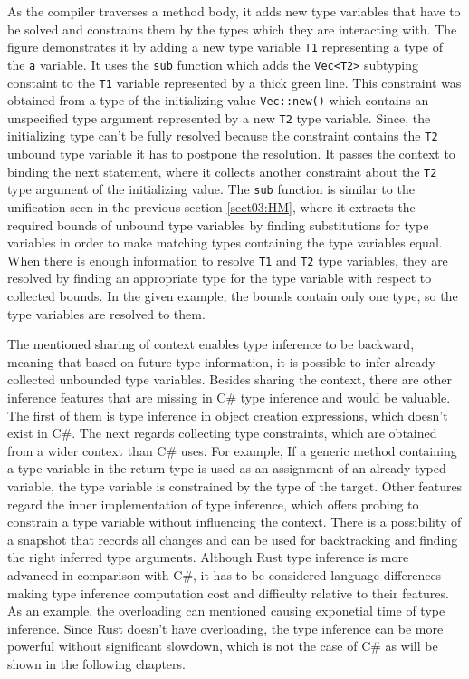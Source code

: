 As the compiler traverses a method body, it adds new type variables that have to be solved and constrains them by the types which they are interacting with. 
The figure demonstrates it by adding a new type variable \texttt{T1} representing a type of the \texttt{a} variable.
It uses the \texttt{sub} function which adds the \texttt{Vec<T2>} subtyping constaint to the \texttt{T1} variable represented by a thick green line.
This constraint was obtained from a type of the initializing value \texttt{Vec::new()} which contains an unspecified type argument represented by a new \texttt{T2} type variable.
Since, the initializing type can't be fully resolved because the constraint contains the \texttt{T2} unbound type variable it has to postpone the resolution. 
It passes the context to binding the next statement, where it collects another constraint about the \texttt{T2} type argument of the initializing value.
The \texttt{sub} function is similar to the unification seen in the previous section \ref{sect03:HM}, where it extracts the required bounds of unbound type variables by finding substitutions for type variables in order to make matching types containing the type variables equal.
When there is enough information to resolve \texttt{T1} and \texttt{T2} type variables, they are resolved by finding an appropriate type for the type variable with respect to collected bounds.
In the given example, the bounds contain only one type, so the type variables are resolved to them.
\par
The mentioned sharing of context enables type inference to be backward, meaning that based on future type information, it is possible to infer already collected unbounded type variables. 
Besides sharing the context, there are other inference features that are missing in C\# type inference and would be valuable. 
The first of them is type inference in object creation expressions, which doesn't exist in C\#. 
The next regards collecting type constraints, which are obtained from a wider context than C\# uses. 
For example, If a generic method containing a type variable in the return type is used as an assignment of an already typed variable, the type variable is constrained by the type of the target. Other features regard the inner implementation of type inference, which offers probing to constrain a type variable without influencing the context. 
There is a possibility of a snapshot that records all changes and can be used for backtracking and finding the right inferred type arguments.
Although Rust type inference is more advanced in comparison with C\#, it has to be considered language differences making type inference computation cost and difficulty relative to their features. 
As an example, the overloading can mentioned causing exponetial time of type inference. 
Since Rust doesn't have overloading, the type inference can be more powerful without significant slowdown, which is not the case of C\# as will be shown in the following chapters.

